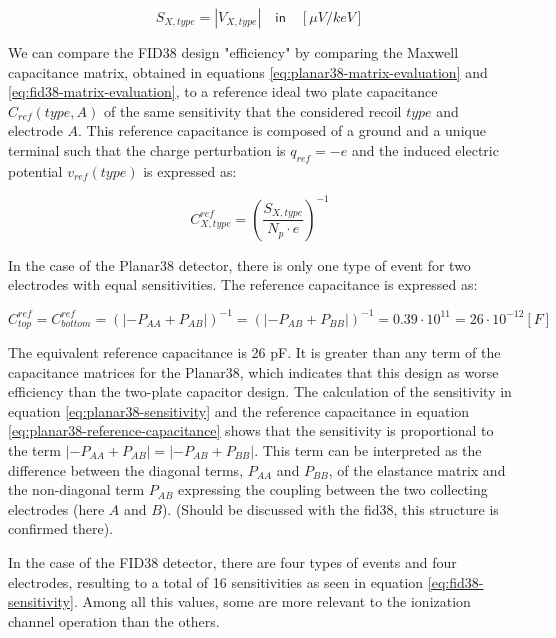 \begin{equation}
S_{X, type} = | V_{X,type} | \quad \textsf{in} \quad [\mu V/keV]
\end{equation}

We can compare the FID38 design "efficiency" by comparing the Maxwell capacitance matrix, obtained in equations \ref{eq:planar38-matrix-evaluation} and \ref{eq:fid38-matrix-evaluation}, to a reference ideal two plate capacitance $C_{ref}(type, A)$ of the same sensitivity that the considered recoil $type$ and electrode $A$. This reference capacitance is composed of a ground and a unique terminal such that the charge perturbation is $q_{ref}=-e$ and the induced electric potential $v_{ref}(type)$ is expressed as:

\begin{equation}
C_{X,type}^{ref} = \left( \frac{S_{X,type}}{N_p \cdot e} \right)^{-1}
\end{equation}

In the case of the Planar38 detector, there is only one type of event for two electrodes with equal sensitivities. The reference capacitance is expressed as:

\begin{equation}
\label{eq:planar38-reference-capacitance}
C_{top}^{ref}
= C_{bottom}^{ref}
= \left( | -P_{AA} + P_{AB} |\right)^{-1}
= \left( | -P_{AB} + P_{BB} |\right)^{-1}
= 0.39 \cdot 10^{11}
= 26 \cdot 10^{-12} [F]
\end{equation}

The equivalent reference capacitance is 26 pF. It is greater than any term of the capacitance matrices for the Planar38, which indicates that this design as worse efficiency than the two-plate capacitor design. The calculation of the sensitivity in equation \ref{eq:planar38-sensitivity} and the reference capacitance in equation \ref{eq:planar38-reference-capacitance} shows that the sensitivity is proportional to the term $| -P_{AA} + P_{AB} | = | -P_{AB} + P_{BB} |$. This term can be interpreted as the difference between the diagonal terms, $P_{AA}$ and $P_{BB}$, of the elastance matrix and the non-diagonal term $P_{AB}$ expressing the coupling between the two collecting electrodes (here $A$ and $B$). (Should be discussed with the fid38, this structure is confirmed there).

In the case of the FID38 detector, there are four types of events and four electrodes, resulting to a total of 16 sensitivities as seen in equation \ref{eq:fid38-sensitivity}. Among all this values, some are more relevant to the ionization channel operation than the others.

